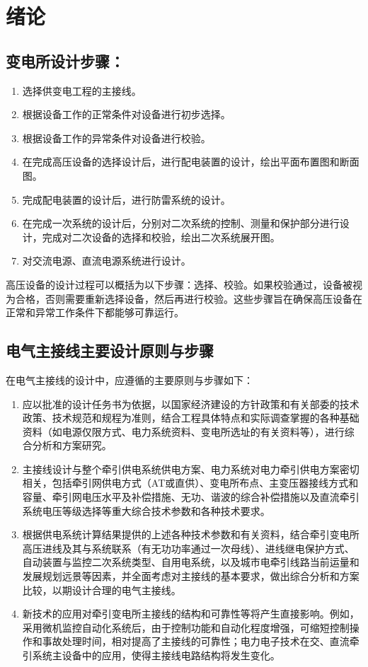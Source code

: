 \chapter{绪论}

\section{变电所设计步骤：}
\begin{enumerate}
	\item 选择供变电工程的主接线。
	\item 根据设备工作的正常条件对设备进行初步选择。
	\item 根据设备工作的异常条件对设备进行校验。
	\item 在完成高压设备的选择设计后，进行配电装置的设计，绘出平面布置图和断面图。
	\item 完成配电装置的设计后，进行防雷系统的设计。
	\item 在完成一次系统的设计后，分别对二次系统的控制、测量和保护部分进行设计，完成对二次设备的选择和校验，绘出二次系统展开图。
	\item 对交流电源、直流电源系统进行设计。
\end{enumerate}
高压设备的设计过程可以概括为以下步骤：选择、校验。如果校验通过，设备被视为合格，否则需要重新选择设备，然后再进行校验。这些步骤旨在确保高压设备在正常和异常工作条件下都能够可靠运行。
\section{电气主接线主要设计原则与步骤}
在电气主接线的设计中，应遵循的主要原则与步骤如下：
\begin{enumerate}
	\item 应以批准的设计任务书为依据，以国家经济建设的方针政策和有关部委的技术政策、技术规范和规程为准则，结合工程具体特点和实际调查掌握的各种基础资料（如电源仅限方式、电力系统资料、变电所选址的有关资料等），进行综合分析和方案研究。
	\item 主接线设计与整个牵引供电系统供电方案、电力系统对电力牵引供电方案密切相关，包括牵引网供电方式（AT或直供）、变电所布点、主变压器接线方式和容量、牵引网电压水平及补偿措施、无功、谐波的综合补偿措施以及直流牵引系统电压等级选择等重大综合技术参数和各种技术要求。
	\item 根据供电系统计算结果提供的上述各种技术参数和有关资料，结合牵引变电所高压进线及其与系统联系（有无功功率通过一次母线）、进线继电保护方式、自动装置与监控二次系统类型、自用电系统，以及城市电牵引线路当前运量和发展规划远景等因素，并全面考虑对主接线的基本要求，做出综合分析和方案比较，以期设计合理的电气主接线。
	\item 新技术的应用对牵引变电所主接线的结构和可靠性等将产生直接影响。例如，采用微机监控自动化系统后，由于控制功能和自动化程度增强，可缩短控制操作和事故处理时间，相对提高了主接线的可靠性；电力电子技术在交、直流牵引系统主设备中的应用，使得主接线电路结构将发生变化。
\end{enumerate}
